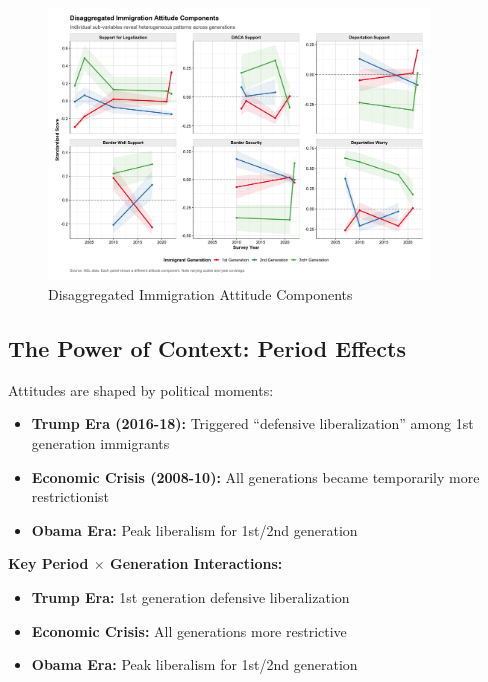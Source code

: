 \documentclass[11pt,letterpaper]{article}
\begin{document}
\begin{figure}[H]
    \centering
    \includegraphics[width=0.9\textwidth]{../../outputs/figure_v4_4_disaggregated_components.png}
    \caption{Disaggregated Immigration Attitude Components}
    \label{fig:disaggregated}
\end{figure}

\subsection{The Power of Context: Period Effects}

Attitudes are shaped by political moments:
\begin{itemize}
    \item \textbf{Trump Era (2016-18):} Triggered ``defensive liberalization'' among 1st generation immigrants
    \item \textbf{Economic Crisis (2008-10):} All generations became temporarily more restrictionist
    \item \textbf{Obama Era:} Peak liberalism for 1st/2nd generation
\end{itemize}

\textbf{Key Period $\times$ Generation Interactions:}
\begin{itemize}
    \item \textbf{Trump Era:} 1st generation defensive liberalization
    \item \textbf{Economic Crisis:} All generations more restrictive
    \item \textbf{Obama Era:} Peak liberalism for 1st/2nd generation
\end{itemize}
\end{document}
